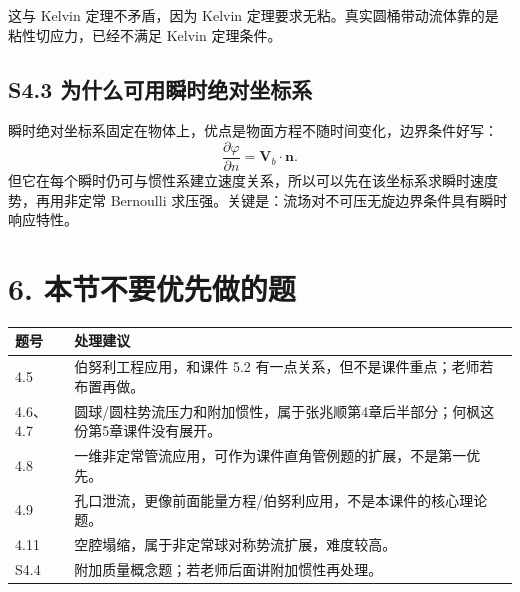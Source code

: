 ﻿\documentclass[UTF8,zihao=-4]{ctexart}
\begin{document}
这与 Kelvin 定理不矛盾，因为 Kelvin 定理要求无粘。真实圆桶带动流体靠的是粘性切应力，已经不满足 Kelvin 定理条件。

\subsection*{S4.3 为什么可用瞬时绝对坐标系}

瞬时绝对坐标系固定在物体上，优点是物面方程不随时间变化，边界条件好写：
\[
\frac{\partial\varphi}{\partial n}
=\bm V_b\cdot\bm n.
\]
但它在每个瞬时仍可与惯性系建立速度关系，所以可以先在该坐标系求瞬时速度势，再用非定常 Bernoulli 求压强。关键是：流场对不可压无旋边界条件具有瞬时响应特性。

\section*{6. 本节不要优先做的题}

\begin{longtable}{p{2.2cm}p{12.5cm}}
\toprule
题号 & 处理建议 \\
\midrule
4.5 & 伯努利工程应用，和课件 5.2 有一点关系，但不是课件重点；老师若布置再做。\\
4.6、4.7 & 圆球/圆柱势流压力和附加惯性，属于张兆顺第4章后半部分；何枫这份第5章课件没有展开。\\
4.8 & 一维非定常管流应用，可作为课件直角管例题的扩展，不是第一优先。\\
4.9 & 孔口泄流，更像前面能量方程/伯努利应用，不是本课件的核心理论题。\\
4.11 & 空腔塌缩，属于非定常球对称势流扩展，难度较高。\\
S4.4 & 附加质量概念题；若老师后面讲附加惯性再处理。\\
\bottomrule
\end{longtable}
\end{document}
